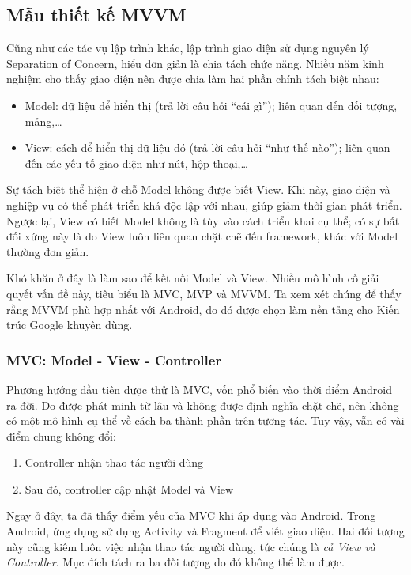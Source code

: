 \documentclass[../../thesis]{subfiles}
\begin{document}
\subsection{Mẫu thiết kế MVVM}\label{sec:mvvm}

Cũng như các tác vụ lập trình khác, lập trình giao diện sử dụng nguyên lý
Separation of Concern, hiểu đơn giản là chia tách chức năng. Nhiều năm kinh
nghiệm cho thấy giao diện nên được chia làm hai phần chính tách biệt nhau:

\begin{itemize}
    \item
        Model: dữ liệu để hiển thị (trả lời câu hỏi ``cái gì''); liên quan đến
        đối tượng, mảng,\ldots
    \item
        View: cách để hiển thị dữ liệu đó (trả lời câu hỏi ``như thế nào'');
        liên quan đến các yếu tố giao diện như nút, hộp thoại,\ldots
\end{itemize}

Sự tách biệt thể hiện ở chỗ Model không được biết View. Khi này, giao diện và
nghiệp vụ có thể phát triển khá độc lập với nhau, giúp giảm thời gian phát
triển. Ngược lại, View có biết Model không là tùy vào cách triển khai cụ thể; có
sự bất đối xứng này là do View luôn liên quan chặt chẽ đến framework, khác với
Model thường đơn giản.

Khó khăn ở đây là làm sao để kết nối Model và View. Nhiều mô hình cố giải quyết
vấn đề này, tiêu biểu là MVC, MVP và MVVM. Ta xem xét chúng để thấy rằng MVVM
phù hợp nhất với Android, do đó được chọn làm nền tảng cho Kiến trúc Google
khuyên dùng.

\subsubsection{MVC: Model - View - Controller}

Phương hướng đầu tiên được thử là MVC, vốn phổ biến vào thời điểm Android ra
đời. Do được phát minh từ lâu và không được định nghĩa chặt chẽ, nên không có
một mô hình cụ thể về cách ba thành phần trên tương tác. Tuy vậy, vẫn có vài
điểm chung không đổi:

\begin{enumerate}
    \item
        Controller nhận thao tác người dùng
    \item
        Sau đó, controller cập nhật Model và View
\end{enumerate}

Ngay ở đây, ta đã thấy điểm yếu của MVC khi áp dụng vào Android. Trong Android,
ứng dụng sử dụng Activity và Fragment để viết giao diện. Hai đối tượng này cũng
kiêm luôn việc nhận thao tác người dùng, tức chúng là \emph{cả View và
Controller}. Mục đích tách ra ba đối tượng do đó không thể làm được.
\end{document}
